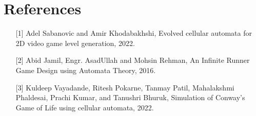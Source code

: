 \documentclass[10pt]{article}
\begin{document}
\section*{\small References}
\begin{enumerate}
    \item [{[1]}] Adel Sabanovic and Amir Khodabakhshi, Evolved cellular automata for 2D video game level generation, 2022.
    \item [{[2]}] Abid Jamil, Engr. AsadUllah and Mohsin Rehman, An Infinite Runner Game Design using Automata Theory, 2016.
    \item [{[3]}] Kuldeep Vayadande, Ritesh Pokarne, Tanmay Patil, Mahalakshmi Phaldesai, Prachi Kumar, and Tanushri Bhuruk, Simulation of Conway's Game of Life using cellular automata, 2022.
\end{enumerate}
\end{document}

